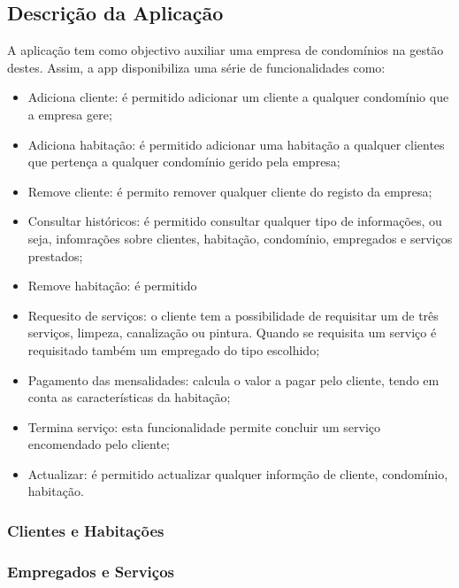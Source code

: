 \documentclass[a4paper]{article}
\begin{document}
\subsection{Descrição da Aplicação}

A aplicação tem como objectivo auxiliar uma empresa de condomínios na gestão destes. Assim, a app disponibiliza uma série de funcionalidades como:

\begin{itemize}

	\item Adiciona cliente: é permitido adicionar um  cliente a qualquer condomínio que a empresa gere;
	\item Adiciona habitação: é permitido adicionar uma habitação a qualquer clientes que pertença a qualquer condomínio gerido pela empresa;
	\item Remove cliente: é permito remover qualquer cliente do registo da empresa;
	\item Consultar históricos: é permitido consultar qualquer tipo de informações, ou seja, infomrações sobre clientes, habitação, condomínio, empregados e serviços prestados;
	\item Remove habitação: é permitido 
	\item Requesito de serviços: o cliente tem a possibilidade de requisitar um de três serviços, limpeza, canalização ou pintura. Quando se requisita um serviço é requisitado também um empregado do tipo escolhido;
	\item Pagamento das mensalidades: calcula o valor a pagar pelo cliente, tendo em conta as características da habitação;
	\item Termina serviço: esta funcionalidade permite concluir um serviço encomendado pelo cliente;
	\item Actualizar: é permitido actualizar qualquer informção de cliente, condomínio, habitação.

\end{itemize}

\subsubsection{Clientes e Habitações}



\subsubsection{Empregados e Serviços}

\newpage
\end{document}
